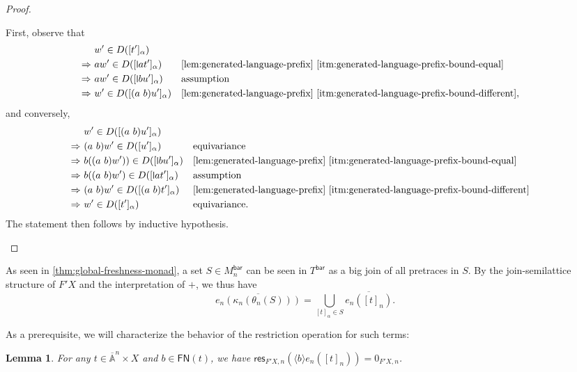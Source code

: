 \documentclass[11pt,a4paper]{amsart}
\newtheorem{lemma}[lemma]{Lemma}
\newcommand{\Br}{\mathsf{bar}}
\newcommand{\res}{\mathsf{res}}
\newcommand{\FN}{\mathsf{FN}}
\newcommand{\Names}{\mathbb{A}}
\newcommand{\barNames}{\overline{\Names}}
\newcommand{\bind}[1]{\langle #1\rangle}
\theoremstyle{plain}
\newcommand{\midmid}{\hspace{0.2ex}{\rule[-0.1ex]{0.6pt}{1.65ex}}\hspace{0.2ex}}
\newcommand{\newletter}[1]{{\midmid}#1}
\numberwithin{equation}{section}
\newcommand{\+}[1]{\mathcal{#1}\xspace}
\theoremstyle{definition}
\begin{document}
\begin{proof}
\begin{itemize}
        First, observe that
        \begin{align*}
          &w' \in D([t']_\alpha) \\
          \Rightarrow~&aw' \in D([\newletter{a}t']_\alpha) && \text{\cref{lem:generated-language-prefix} \eqref{itm:generated-language-prefix-bound-equal}} \\
          \Rightarrow~&aw' \in D([\newletter{b}u']_\alpha) && \text{assumption} \\
          \Rightarrow~&w' \in D([(a\ b)u']_\alpha) && \text{\cref{lem:generated-language-prefix} \eqref{itm:generated-language-prefix-bound-different}},
        \end{align*}
        and conversely,
        \begin{align*}
          &w' \in D([(a\ b)u']_\alpha) \\
          \Rightarrow~&(a\ b)w' \in D([u']_\alpha) && \text{equivariance} \\
          \Rightarrow~&b((a\ b)w')) \in D([\newletter{b}u']_\alpha) && \text{\cref{lem:generated-language-prefix} \eqref{itm:generated-language-prefix-bound-equal}} \\
          \Rightarrow~&b((a\ b)w') \in D([\newletter{a}t']_\alpha) && \text{assumption} \\
          \Rightarrow~&(a\ b)w' \in D([(a\ b)t']_\alpha) && \text{\cref{lem:generated-language-prefix} \eqref{itm:generated-language-prefix-bound-different}} \\
          \Rightarrow~&w' \in D([t']_\alpha) && \text{equivariance}.
        \end{align*}
        The statement then follows by inductive hypothesis.
  \end{itemize}
\end{proof}

\noindent As seen in \cref{thm:global-freshness-monad}, a set \(S \in M^\Br_n\) can be seen in \(T^\Br\) as a big join of all pretraces in \(S\).
By the join-semilattice structure of \(F' X\) and the interpretation of \(+\), we thus have
\begin{equation*}
  \overline{e_n(\kappa_n(\theta_n(S)))} = \bigcup_{[t]_\alpha \in S} \overline{e_n([t]_n)}.
\end{equation*}

As a prerequisite, we will characterize the behavior of the restriction operation for such terms:
\begin{lemma}\label{lem:generated-language-restriction}
  For any \(t \in \barNames^n \times X\) and \(b \in \FN(t)\), we have \(\res_{F'X, n}(\bind{b} e_n([t]_n)) = 0_{F'X, n}\).
\end{lemma}
\end{document}
